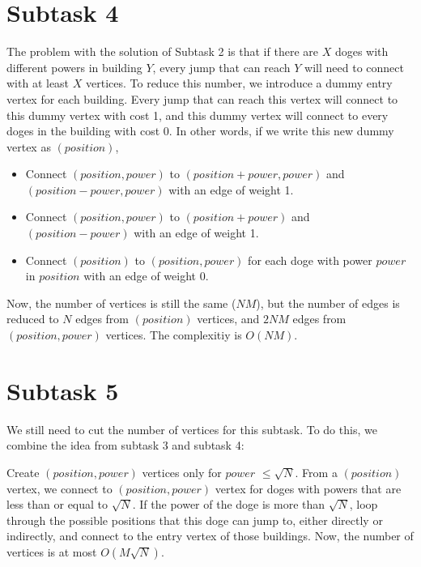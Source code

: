 \documentclass[a4paper,11pt]{article}
\begin{document}
\section{Subtask 4}
The problem with the solution of Subtask 2 is that if there are $X$ doges with different powers in building $Y$, every jump that can reach $Y$ will need to connect with at least $X$ vertices. To reduce this number, we introduce a dummy entry vertex for each building. Every jump that can reach this vertex will connect to this dummy vertex with cost 1, and this dummy vertex will connect to every doges in the building with cost 0. In other words, if we write this new dummy vertex as $(position)$,
\begin{itemize}
    \item Connect $(position, power)$ to $(position + power, power)$ and $(position - power, power)$ with an edge of weight 1.
    \item Connect $(position, power)$ to $(position + power)$ and $(position - power)$ with an edge of weight 1.
    \item Connect $(position)$ to $(position, power)$ for each doge with power $power$ in $position$ with an edge of weight 0.
\end{itemize}
Now, the number of vertices is still the same ($NM$), but the number of edges is reduced to $N$ edges from $(position)$ vertices, and $2NM$ edges from $(position, power)$ vertices. The complexitiy is $O(NM)$.

\section{Subtask 5}
We still need to cut the number of vertices for this subtask. To do this, we combine the idea from subtask 3 and subtask 4:

Create $(position, power)$ vertices only for $power$ $\leq \sqrt{N}$.
From a $(position)$ vertex, we connect to $(position, power)$ vertex for doges with powers that are less than or equal to $\sqrt{N}$.
If the power of the doge is more than $\sqrt{N}$, loop through the possible positions that this doge can jump to, either directly or indirectly, and connect to the entry vertex of those buildings.
Now, the number of vertices is at most $O(M\sqrt{N})$.
\end{document}

